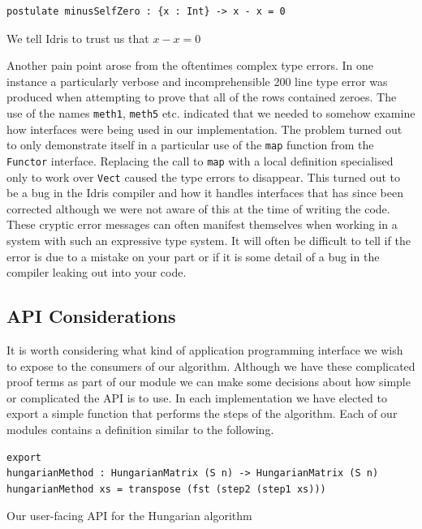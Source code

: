 \documentclass[a4paper, notitlepage]{report}
\begin{document}
\begin{listing}[H]
\begin{verbatim}
postulate minusSelfZero : {x : Int} -> x - x = 0
\end{verbatim}
\caption{We tell Idris to trust us that \(x\mathbin{-} x \mathrel{=} 0\)}
\end{listing}

Another pain point arose from the oftentimes complex type errors. In one
instance a particularly verbose and incomprehensible 200 line type error was
produced when attempting to prove that all of the rows contained zeroes. The use
of the names \texttt{meth1}, \texttt{meth5} etc. indicated that we needed to somehow examine how
interfaces were being used in our implementation. The problem turned out to only
demonstrate itself in a particular use of the \texttt{map} function from the \texttt{Functor}
interface. Replacing the call to \texttt{map} with a local definition specialised only to
work over \texttt{Vect} caused the type errors to disappear. This turned out to be a bug
in the Idris compiler and how it handles interfaces that has since been
corrected although we were not aware of this at the time of writing the code.
These cryptic error messages can often manifest themselves when working in a
system with such an expressive type system. It will often be difficult to tell
if the error is due to a mistake on your part or if it is some detail of a bug
in the compiler leaking out into your code.

\subsection{API Considerations}
\label{sec:org41ff26f}
It is worth considering what kind of application programming interface we wish
to expose to the consumers of our algorithm. Although we have these complicated
proof terms as part of our module we can make some decisions about how simple or
complicated the API is to use. In each implementation we have elected to export
a simple function that performs the steps of the algorithm. Each of our modules
contains a definition similar to the following.

\begin{listing}[H]
\begin{verbatim}
export
hungarianMethod : HungarianMatrix (S n) -> HungarianMatrix (S n)
hungarianMethod xs = transpose (fst (step2 (step1 xs)))
\end{verbatim}
\caption{Our user-facing API for the Hungarian algorithm}
\end{listing}
\end{document}
